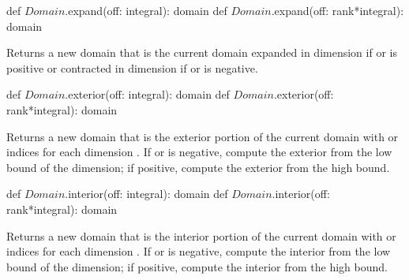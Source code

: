 \begin{protohead}
def $Domain$.expand(off: integral): domain
def $Domain$.expand(off: rank*integral): domain
\end{protohead}
\begin{protobody}
Returns a new domain that is the current domain expanded in
dimension  if  or  is positive or
contracted in dimension  if  or  is
negative.
\end{protobody}

\begin{protohead}
def $Domain$.exterior(off: integral): domain
def $Domain$.exterior(off: rank*integral): domain
\end{protohead}
\begin{protobody}
Returns a new domain that is the exterior portion of the current
domain with  or  indices for each
dimension .  If  or  is negative,
compute the exterior from the low bound of the dimension; if positive,
compute the exterior from the high bound.
\end{protobody}

\begin{protohead}
def $Domain$.interior(off: integral): domain
def $Domain$.interior(off: rank*integral): domain
\end{protohead}
\begin{protobody}
Returns a new domain that is the interior portion of the current
domain with  or  indices for each
dimension .  If  or  is negative,
compute the interior from the low bound of the dimension; if positive,
compute the interior from the high bound.
\end{protobody}

